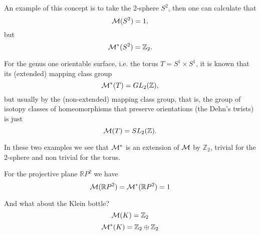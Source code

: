 \documentclass[12pt]{article}
\begin{document}
An example of this concept is to take the 2-sphere $S^2$, then one can calculate that
$${\cal{M}}(S^2)=1,$$
but 
$${\cal{M}}^*(S^2)={\mathbb{Z}}_2.$$

For the genus one orientable surface, i.e. the torus $T=S^1\times S^1$, it is known that its (extended) mapping class group 
$${\cal{M}}^*(T)=GL_2({\mathbb{Z}}),$$ 
but usually by the (non-extended) mapping class group, that is, the group of isotopy classes of homeomorphisms that preserve orientations (the Dehn's twists) is just
$${\cal{M}}(T)=SL_2({\mathbb{Z}}).$$

In these two examples we see that $\cal{M}^*$ is an extension of $\cal{M}$ by ${\mathbb{Z}}_2$, trivial for the 2-sphere and non trivial for the torus.

For the projective plane ${\mathbb{R}}P^2$ we have 
$${\cal{M}}({\mathbb{R}}P^2)={\cal{M}}^*({\mathbb{R}}P^2)=1$$

And what about the Klein bottle?
$${\cal{M}}(K)={\mathbb{Z}}_2$$
$${\cal{M}}^*(K)={\mathbb{Z}}_2\oplus{\mathbb{Z}}_2$$
\end{document}
